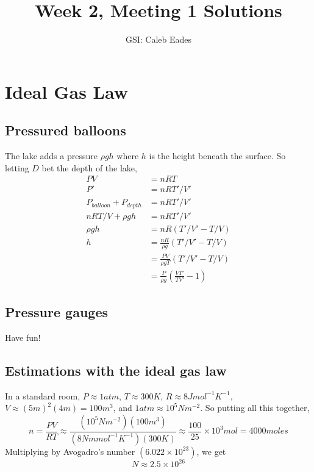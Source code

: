\documentclass{article}
\begin{document}
	
\title{Week 2, Meeting 1 Solutions}
\author{GSI: Caleb Eades}
\maketitle

\section{Ideal Gas Law}

\subsection{Pressured balloons}

The lake adds a pressure $\rho gh$ where $h$ is the height beneath the surface. So letting $D$ bet the depth of the lake,
\begin{align*}
PV &= nRT \\
P' &= nRT'/V' \\
P_{balloon} + P_{depth} &= nRT'/V' \\
nRT/V + \rho gh &= nRT'/V' \\
\rho gh &= nR(T'/V'-T/V) \\
h &= \frac{nR}{\rho g}(T'/V'-T/V) \\
&= \frac{PV}{\rho gT}(T'/V'-T/V) \\
&= \frac{P}{\rho g}\left(\frac{VT'}{TV'}-1\right)
\end{align*}

\subsection{Pressure gauges}

Have fun!

\subsection{Estimations with the ideal gas law}

In a standard room, $P\approx 1 atm$, $T \approx 300 K$, $R\approx 8 J mol^{-1} K^{-1}$, $V\approx (5 m)^2(4 m) = 100 m^3$, and $1 atm\approx 10^5 N m^{-2}$. So putting all this together,
\begin{equation}
n = \frac{PV}{RT} \approx \frac{(10^5 N m^{-2})(100 m^3)}{(8 N m mol^{-1} K^{-1})(300 K)} \approx \frac{100}{25}\times 10^3 mol = 4000 moles
\end{equation}
Multiplying by Avogadro's number $\left(6.022\times10^{23}\right)$, we get
\begin{equation}
N\approx 2.5\times10^{26}
\end{equation}
\end{document}
